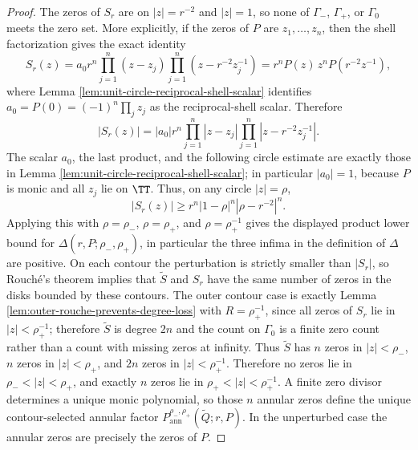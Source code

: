 \begin{proof}
The zeros of \(S_r\) are on \(|z|=r^{-2}\) and \(|z|=1\), so none of \(\Gamma_-\), \(\Gamma_+\), or \(\Gamma_0\) meets the zero set.  More explicitly, if the zeros of \(P\) are \(z_1,\dots,z_n\), then the shell factorization gives the exact identity
\[
S_r(z)
=a_0r^n\prod_{j=1}^n(z-z_j)
\prod_{j=1}^n(z-r^{-2}z_j^{-1})
=r^nP(z)\,z^nP(r^{-2}z^{-1}),
\]
where Lemma \ref{lem:unit-circle-reciprocal-shell-scalar} identifies
\(a_0=P(0)=(-1)^n\prod_jz_j\) as the reciprocal-shell scalar.  Therefore
\[
|S_r(z)|
=|a_0|r^n\prod_{j=1}^n |z-z_j|\prod_{j=1}^n |z-r^{-2}z_j^{-1}|.
\]
The scalar \(a_0\), the last product, and the following circle estimate
are exactly those in Lemma \ref{lem:unit-circle-reciprocal-shell-scalar};
in particular \(|a_0|=1\), because \(P\) is monic and all \(z_j\) lie on
\(\TT\).  Thus, on any circle \(|z|=\rho\),
\[
|S_r(z)|\ge r^n |1-\rho|^n|\rho-r^{-2}|^n.
\]
Applying this with \(\rho=\rho_-\), \(\rho=\rho_+\), and
\(\rho=\rho_+^{-1}\) gives the displayed product lower bound for
\(\Delta(r,P;\rho_-,\rho_+)\), in particular the three infima in the
definition of \(\Delta\) are positive.  On each contour the perturbation is strictly smaller than \(|S_r|\), so Rouch\'e's theorem implies that \(\widetilde S\) and \(S_r\) have the same number of zeros in the disks bounded by these contours.  The outer contour case is exactly Lemma \ref{lem:outer-rouche-prevents-degree-loss} with \(R=\rho_+^{-1}\), since all zeros of \(S_r\) lie in \(|z|<\rho_+^{-1}\); therefore \(\widetilde S\) is degree \(2n\) and the count on \(\Gamma_0\) is a finite zero count rather than a count with missing zeros at infinity.  Thus \(\widetilde S\) has \(n\) zeros in \(|z|<\rho_-\), \(n\) zeros in \(|z|<\rho_+\), and \(2n\) zeros in \(|z|<\rho_+^{-1}\).  Therefore no zeros lie in \(\rho_-<|z|<\rho_+\), and exactly \(n\) zeros lie in \(\rho_+<|z|<\rho_+^{-1}\).  A finite zero divisor determines a unique monic polynomial, so those \(n\) annular zeros define the unique contour-selected annular factor \(P_{\mathrm{ann}}^{\rho_-,\rho_+}(\widetilde Q;r,P)\).  In the unperturbed case the annular zeros are precisely the zeros of \(P\).


\end{proof}
